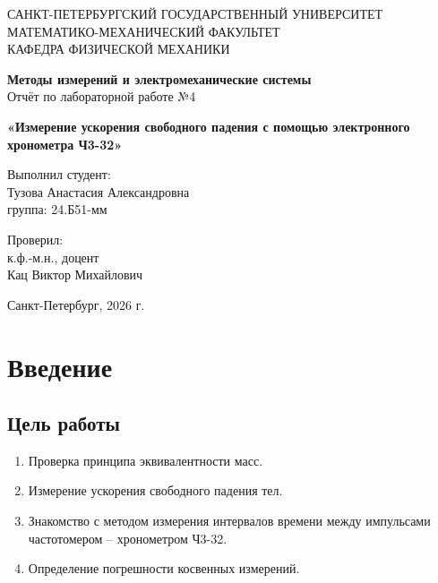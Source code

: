\documentclass[14pt,a4paper]{extarticle}
\begin{document}
\thispagestyle{empty}

\begin{center}
САНКТ-ПЕТЕРБУРГСКИЙ ГОСУДАРСТВЕННЫЙ УНИВЕРСИТЕТ\\
МАТЕМАТИКО-МЕХАНИЧЕСКИЙ ФАКУЛЬТЕТ\\
КАФЕДРА ФИЗИЧЕСКОЙ МЕХАНИКИ
\end{center}

\vspace{4cm}

\begin{center}
\textbf{Методы измерений и электромеханические системы}\\
\vspace{0.5cm}
Отчёт по лабораторной работе №4
\end{center}

\vspace{0.5cm}

\begin{center}
\textbf{«Измерение ускорения свободного падения с помощью электронного хронометра Ч3-32»}
\end{center}

\vspace{4cm}

\begin{flushright}
Выполнил студент:\\
Тузова Анастасия Александровна\\
группа: 24.Б51-мм

\vspace{1.5cm}

Проверил:\\
к.ф.-м.н., доцент\\
Кац Виктор Михайлович
\end{flushright}

\vfill

\begin{center}
Санкт-Петербург, 2026 г.
\end{center}
\newpage  
\tableofcontents 
\newpage
\section{Введение}
\subsection{Цель работы}
 
\begin{enumerate}
    \item Проверка принципа эквивалентности масс.
    \item Измерение ускорения свободного падения тел.
    \item Знакомство с методом измерения интервалов времени между импульсами частотомером – хронометром Ч3-32.
    \item Определение погрешности косвенных измерений.
\end{enumerate}
\newpage
\end{document}
